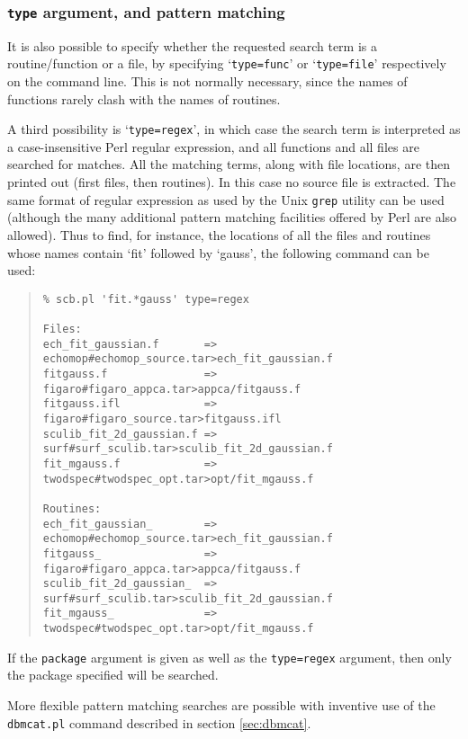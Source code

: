 \documentclass[twoside,11pt]{article}
\newcommand{\xlabel}[1]{}
\renewcommand{\_}{\texttt{\symbol{95}}}
\begin{document}
\subsubsection{\xlabel{sec:extract-type}\label{sec:extract-type}{\tt type} argument, and pattern matching}

It is also possible to specify whether the requested search
term is a routine/function or a file, by specifying `{\tt type=func}'
or `{\tt type=file}' respectively on the command line.  This is not
normally necessary, since the names of functions rarely clash with
the names of routines.

A third possibility is `{\tt type=regex}', in which case the 
search term is interpreted as a case-insensitive 
Perl regular expression, and
all functions and all files are searched for matches.
All the matching terms, along with file locations, are then printed out
(first files, then routines).
In this case no source file is extracted.
The same format of regular expression as used by the Unix {\tt grep}
utility can be used 
(although the many additional pattern matching facilities
offered by Perl are also allowed).
Thus to find, for instance, the locations of 
all the files and routines whose names contain `fit' followed
by `gauss', the following command can be used:
\begin{quote}
\begin{verbatim}
% scb.pl 'fit.*gauss' type=regex

Files:
ech_fit_gaussian.f       => echomop#echomop_source.tar>ech_fit_gaussian.f
fitgauss.f               => figaro#figaro_appca.tar>appca/fitgauss.f
fitgauss.ifl             => figaro#figaro_source.tar>fitgauss.ifl
sculib_fit_2d_gaussian.f => surf#surf_sculib.tar>sculib_fit_2d_gaussian.f
fit_mgauss.f             => twodspec#twodspec_opt.tar>opt/fit_mgauss.f

Routines:
ech_fit_gaussian_        => echomop#echomop_source.tar>ech_fit_gaussian.f
fitgauss_                => figaro#figaro_appca.tar>appca/fitgauss.f
sculib_fit_2d_gaussian_  => surf#surf_sculib.tar>sculib_fit_2d_gaussian.f
fit_mgauss_              => twodspec#twodspec_opt.tar>opt/fit_mgauss.f
\end{verbatim}
\end{quote}
If the {\tt package} argument is given as well as the {\tt type=regex}
argument, then only the package specified will be searched.

More flexible pattern matching searches are possible 
with inventive use of the {\tt dbmcat.pl} command described
in section \ref{sec:dbmcat}.
\end{document}
